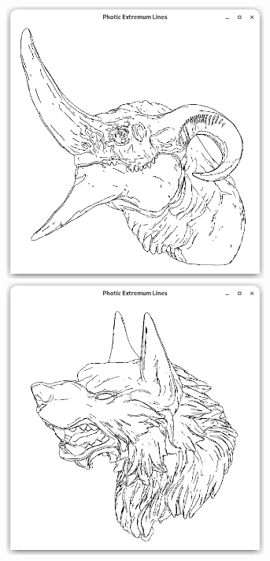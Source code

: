\documentclass[9pt,fleqn,twoside,twocolumn]{stdglobal}
\begin{document}
\begin{figure}
\begin{subfigure}[t]{0.19\textwidth}
        \includegraphics[width=0.95\textwidth,trim={15px 15 15 50},clip]{images/results/dragon-head-contours-pel.png}
        \includegraphics[width=0.95\textwidth,trim={15px 15 15 50},clip]{images/results/werewolf-contours-pel.png}

\end{subfigure}
\end{figure}
\end{document}
